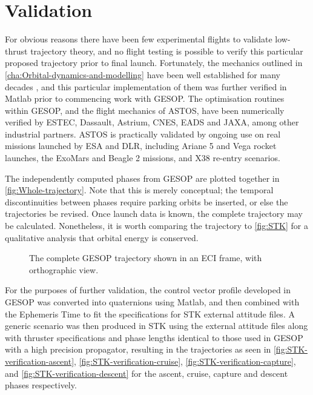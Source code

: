 
\clearpage


\section{Validation} \label{sec:Validation}
For obvious reasons there have been few experimental flights to validate low-thrust trajectory theory, and no flight testing is possible to verify this particular proposed trajectory prior to final launch. Fortunately, the mechanics outlined in \autoref{cha:Orbital-dynamics-and-modelling} have been well established for many decades \parencite{Kaplan1976}, and this particular implementation of them was further verified in Matlab prior to commencing work with GESOP. The optimisation routines within GESOP, and the flight mechanics of ASTOS, have been numerically verified by ESTEC, Dassault, Astrium, CNES, EADS and JAXA, among other industrial partners. ASTOS is practically validated by ongoing use on real missions launched by ESA and DLR, including Ariane 5 and Vega rocket launches, the ExoMars and Beagle 2 missions, and X38 re-entry scenarios.

The independently computed phases from GESOP are plotted together in \autoref{fig:Whole-trajectory}. Note that this is merely conceptual; the temporal discontinuities between phases require parking orbits be inserted, or else the trajectories be revised. Once launch data is known, the complete trajectory may be calculated. Nonetheless, it is worth comparing the trajectory to \autoref{fig:STK} for a qualitative analysis that orbital energy is conserved.

\begin{figure}
\centering
\def\svgwidth{\textwidth}

\caption{The complete GESOP trajectory shown in an ECI frame, with orthographic view.} \label{fig:Whole-trajectory}
\end{figure}

For the purposes of further validation, the control vector profile developed in GESOP was converted into quaternions using Matlab, and then combined with the Ephemeris Time to fit the specifications for STK external attitude files. A generic scenario was then produced in STK using the external attitude files along with thruster specifications and phase lengths identical to those used in GESOP with a high precision propagator, resulting in the trajectories as seen in \autoref{fig:STK-verification-ascent}, \autoref{fig:STK-verification-cruise}, \autoref{fig:STK-verification-capture}, and \autoref{fig:STK-verification-descent} for the ascent, cruise, capture and descent phases respectively.

